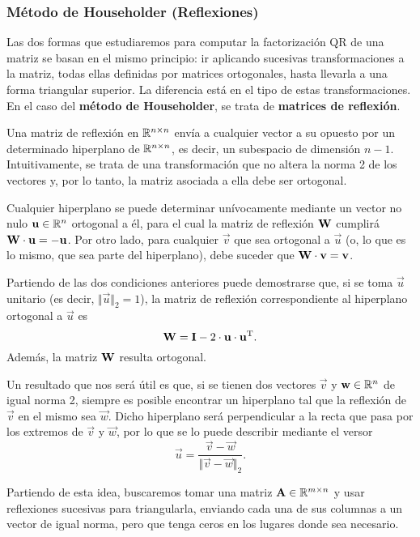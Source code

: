 \subsubsection{Método de Householder (Reflexiones)}
Las dos formas que estudiaremos para computar la factorización QR de una
matriz se basan en el mismo principio: ir aplicando sucesivas transformaciones
a la matriz, todas ellas definidas por matrices ortogonales, hasta llevarla
a una forma triangular superior. La diferencia está en el tipo de estas
transformaciones. En el caso del \textbf{método de Householder}, se trata
de \textbf{matrices de reflexión}.

Una matriz de reflexión en $\mathbb{R}^{n \times n}$ envía a cualquier vector
a su opuesto por un determinado hiperplano de $\mathbb{R}^{n \times n}$, es
decir, un subespacio de dimensión $n-1$. Intuitivamente, se trata de una
transformación que no altera la norma 2 de los vectores y, por lo tanto,
la matriz asociada a ella debe ser ortogonal.

Cualquier hiperplano se puede determinar unívocamente mediante
un vector no nulo $\mathbf{u} \in \mathbb{R}^{n}$ ortogonal a él, para el cual la
matriz de reflexión $\mathbf{W}$ cumplirá $\mathbf{W} \cdot \mathbf{u} = - \mathbf{u}$.
Por otro lado, para cualquier $\vec{v}$ que sea ortogonal a $\vec{u}$ (o, lo
que es lo mismo, que sea parte del hiperplano), debe suceder que
$\mathbf{W} \cdot \mathbf{v} = \mathbf{v}$.

Partiendo de las dos condiciones anteriores puede demostrarse que, si
se toma $\vec{u}$ unitario (es decir, $\Vert \vec{u} \Vert_2 = 1$),
la matriz de reflexión correspondiente al hiperplano
ortogonal a $\vec{u}$ es
\[ \mathbf{W} = \mathbf{I} - 2 \cdot \mathbf{u} \cdot \mathbf{u}^{\mathrm{T}}. \]
Además, la matriz $\mathbf{W}$ resulta ortogonal.

Un resultado que nos será útil es que, si se tienen dos vectores $\vec{v}$ y
$\mathbf{w} \in \mathbb{R}^n$ de igual norma 2, siempre es posible encontrar un
hiperplano tal que la reflexión de $\vec{v}$ en el mismo sea $\vec{w}$.
Dicho hiperplano será perpendicular a la recta que pasa por los extremos de
$\vec{v}$ y $\vec{w}$, por lo que se lo puede describir mediante el versor
\[ \vec{u} = \frac{\vec{v} - \vec{w}}{\Vert \vec{v} - \vec{w} \Vert_2}. \]

Partiendo de esta idea, buscaremos tomar una matriz
$\mathbf{A} \in \mathbb{R}^{m \times n}$ y usar reflexiones sucesivas para
triangularla, enviando cada una de sus columnas a
un vector de igual norma, pero que tenga ceros en los lugares donde sea
necesario.

